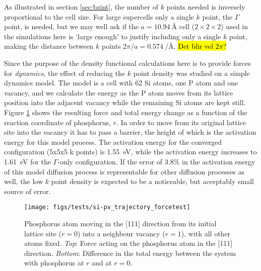 \documentclass[11pt,bibliography=totoc,index=totoc]{scrbook}   %
\newcommand{\comment}[1]{\hl{#1}}
\begin{document}

As illustrated in section \ref{sec:bzint}, the number of $k$ points needed is inversely proportional to the cell size.
For large supercells only a single $k$ point, the $\Gamma$ point, is needed, but we
may well ask if the $a=\SI{10.94}{\angstrom}$ cell ($2\times 2\times 2$) used in the simulations here is `large enough' to justify including only a single $k$ point, making the distance between $k$ points $2\pi/a = \SI{0.574}{\per\angstrom}$. \comment{Det blir vel $2\pi$?}

Since the purpose of the density functional calculations here is to provide forces for \emph{dynamics},
the effect of reducing the $k$ point density was studied on a simple dynamics model.
The model is a cell with 62 Si atoms, one P atom and one vacancy, and we calculate the energy as the P atom moves from its lattice position into the adjacent vacancy while the remaining Si atoms are kept still. 
Figure \ref{fig:tests/si-pv_k} shows the resulting force and total energy change as a function of the reaction coordinate of phosphorus, $r$. 
In order to move from its original lattice site into the vacancy it has to pass a barrier, the height of which is the activation energy for this model process.
The activation energy for the converged configuration (5x5x5 k points) is 1.55~eV, while the activation energy increases to 1.61~eV for the $\Gamma$-only configuration.
If the error of 3.8\% in the activation energy of this model diffusion process is representable for other diffusion processes as well, 
the low $k$ point density is expected to be a noticeable, but acceptably small source of error.

\begin{figure}[htbp]
  \begin{center}
    \texttt{[image: figs/tests/si-pv\_trajectory\_forcetest]}
  \end{center}
  \caption{Phosphorus atom moving in the [111] direction from its initial lattice site ($r=0$) into a neighbour vacancy ($r=1$),
    with all other atoms fixed.
    \textit{Top}: Force acting on the phosphorus atom in the [111] direction. 
    \textit{Bottom}: Difference in the total energy between the system with phosphorus at $r$ and at $r=0$.
    }
    \label{fig:tests/si-pv_k}
\end{figure}
\end{document}
